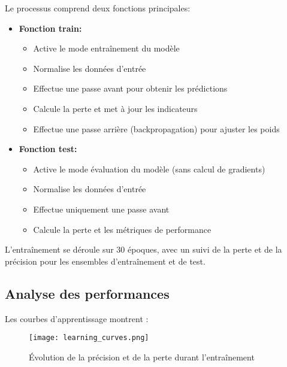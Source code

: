 Le processus comprend deux fonctions principales:
\begin{itemize}
    \item \textbf{Fonction train:}
    \begin{itemize}
        \item Active le mode entraînement du modèle
        \item Normalise les données d'entrée
        \item Effectue une passe avant pour obtenir les prédictions
        \item Calcule la perte et met à jour les indicateurs
        \item Effectue une passe arrière (backpropagation) pour ajuster les poids
    \end{itemize}
    
    \item \textbf{Fonction test:}
    \begin{itemize}
        \item Active le mode évaluation du modèle (sans calcul de gradients)
        \item Normalise les données d'entrée
        \item Effectue uniquement une passe avant
        \item Calcule la perte et les métriques de performance
    \end{itemize}
\end{itemize}

L'entraînement se déroule sur 30 époques, avec un suivi de la perte et de la précision pour les ensembles d'entraînement et de test.
\newpage
\subsection{Analyse des performances}
\label{subsec:performances}

Les courbes d'apprentissage montrent :

\begin{figure}[H]
    \centering
    \texttt{[image: learning\_curves.png]}
    \caption{Évolution de la précision et de la perte durant l'entraînement}
    \label{fig:curves}
\end{figure}

